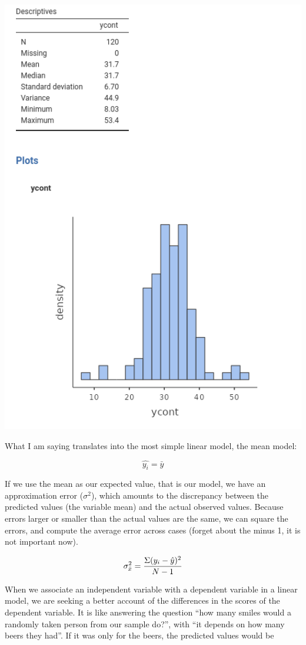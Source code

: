 \documentclass[
]{book}
\begin{document}
\includegraphics[width=6.64in]{bookletpics/ap_a_output1}

What I am saying translates into the most simple linear model, the mean model:

\[ \hat{y_i}=\bar{y}\]

If we use the mean as our expected value, that is our model, we have an approximation error (\(\sigma^2\)), which amounts to the discrepancy between the predicted values (the variable mean) and the actual observed values. Because errors larger or smaller than the actual values are the same, we can square the errors, and compute the average error across cases (forget about the minus 1, it is not important now).

\[ \sigma^2_{\bar{x}}={\Sigma{(y_i-\hat{y})^2} \over {N-1}}\]

When we associate an independent variable with a dependent variable in a linear model, we are seeking a better account of the differences in the scores of the dependent variable. It is like answering the question ``how many smiles would a randomly taken person from our sample do?'', with ``it depends on how many beers they had''. If it was only for the beers, the predicted values would be
\end{document}
